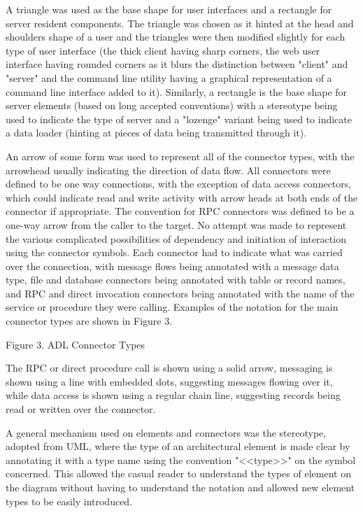 \begin{itemise}
  

  A triangle was used as the base shape for user interfaces and a rectangle for server resident components.  The triangle was chosen as it hinted at the head and shoulders shape of a user and the triangles were then modified slightly for each type of user interface (the thick client having sharp corners, the web user interface having rounded corners as it blurs the distinction between "client" and "server" and the command line utility having a graphical representation of a command line interface added to it).  Similarly, a rectangle is the base shape for server elements (based on long accepted conventions) with a stereotype being used to indicate the type of server and a "lozenge" variant being used to indicate a data loader (hinting at pieces of data being transmitted through it).

  An arrow of some form was used to represent all of the connector types, with the arrowhead usually indicating the direction of data flow.  All connectors were defined to be one way connections, with the exception of data access connectors, which could indicate read and write activity with arrow heads at both ends of the connector if appropriate.  The convention for RPC connectors was defined to be a one-way arrow from the caller to the target.  No attempt was made to represent the various complicated possibilities of dependency and initiation of interaction using the connector symbols.  Each connector had to indicate what was carried over the connection, with message flows being annotated with a message data type, file and database connectors being annotated with table or record names, and RPC and direct invocation connectors being annotated with the name of the service or procedure they were calling.  Examples of the notation for the main connector types are shown in Figure 3. 

Figure 3.  ADL Connector Types

  The RPC or direct procedure call is shown using a solid arrow, messaging is shown using a line with embedded dots, suggesting messages flowing over it, while data access is shown using a regular chain line, suggesting records being read or written over the connector.

  A general mechanism used on elements and connectors was the stereotype, adopted from UML, where the type of an architectural element is made clear by annotating it with a type name using the convention "<<type>>" on the symbol concerned.  This allowed the casual reader to understand the types of element on the diagram without having to understand the notation and allowed new element types to be easily introduced.


\end{itemise}
